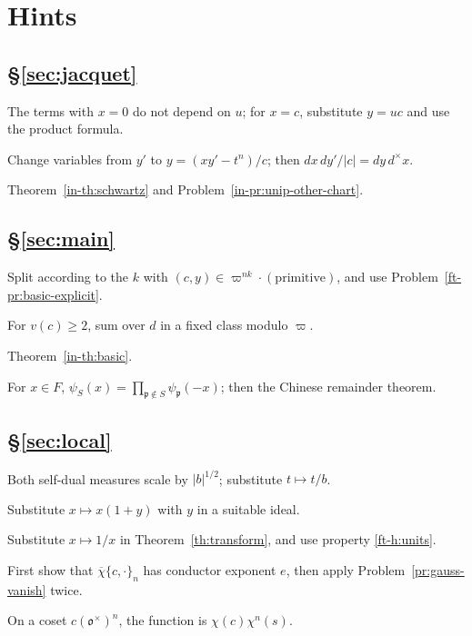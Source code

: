 \documentclass[reqno]{amsart}
\newcommand{\oo}{\mathfrak{o}}
\newcommand{\pp}{\mathfrak{p}}
\numberwithin{equation}{section}
\theoremstyle{definition}
\theoremstyle{plain}
\newenvironment{hints}{\begin{description}[font=\normalfont\bfseries]}{\end{description}}
\begin{document}
\section*{Hints}

\subsection*{\S\ref{sec:jacquet}}
\begin{hints}
\item[\ref{pr:fourier-coeff}] The terms with $x = 0$ do not depend on $u$; for $x = c$, substitute $y = u c$ and use the product formula.
\item[\ref{pr:formal-kernel}] Change variables from $y'$ to $y = (x y' - t^n) / c$; then $d x \, d y' / \lvert c \rvert = d y \, d^\times x$.
\item[\ref{pr:third-difference}] Theorem~\ref{in-th:schwartz} and Problem~\ref{in-pr:unip-other-chart}.
\end{hints}

\subsection*{\S\ref{sec:main}}
\begin{hints}
\item[\ref{pr:gr-sums}] Split according to the $k$ with $(c, y) \in \varpi^{n k} \cdot (\text{primitive})$, and use Problem~\ref{ft-pr:basic-explicit}.
\item[\ref{pr:gr-values}] For $v(c) \geq 2$, sum over $d$ in a fixed class modulo $\varpi$.
\item[\ref{pr:basic-dual}] Theorem~\ref{in-th:basic}.
\item[\ref{pr:product-basic}] For $x \in F$, $\psi_S(x) = \prod_{\pp \notin S} \psi_\pp(-x)$; then the Chinese remainder theorem.
\end{hints}

\subsection*{\S\ref{sec:local}}
\begin{hints}
\item[\ref{pr:change-character}] Both self-dual measures scale by $\lvert b \rvert^{1/2}$; substitute $t \mapsto t / b$.
\item[\ref{pr:gauss-vanish}] Substitute $x \mapsto x (1 + y)$ with $y$ in a suitable ideal.
\item[\ref{pr:twisted-reduction}] Substitute $x \mapsto 1/x$ in Theorem~\ref{th:transform}, and use property \ref{ft-h:units}.
\item[\ref{pr:twisted-support}] First show that $\overline{\chi} \{c, \cdot\}_n$ has conductor exponent $e$, then apply Problem~\ref{pr:gauss-vanish} twice.
\item[\ref{pr:twisted-vanishing}] On a coset $c (\oo^\times)^n$, the function is $\chi(c) \chi^n(s)$.
\end{hints}
\end{document}
